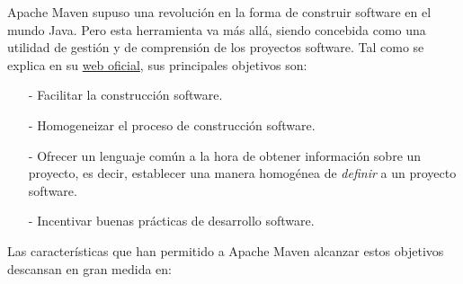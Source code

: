\documentclass[a4paper]{article}
\begin{document}
    Apache Maven supuso una revolución en la forma de construir software en el mundo Java. Pero esta herramienta va más allá, siendo concebida como una utilidad de gestión y de comprensión de los proyectos software. Tal como se explica en su \href{https://maven.apache.org/what-is-maven.html}{web oficial}, sus principales objetivos son:
    
    \begin{itemize}
    	\item[-] Facilitar la construcción software.
    	\item[-] Homogeneizar el proceso de construcción software.
    	\item[-] Ofrecer un lenguaje común a la hora de obtener información sobre un proyecto, es decir, establecer una manera homogénea de \emph{definir} a un proyecto software.
    	\item[-] Incentivar buenas prácticas de desarrollo software.
    \end{itemize}
    
    Las características que han permitido a Apache Maven alcanzar estos objetivos descansan en gran medida en:
    
\end{document}
